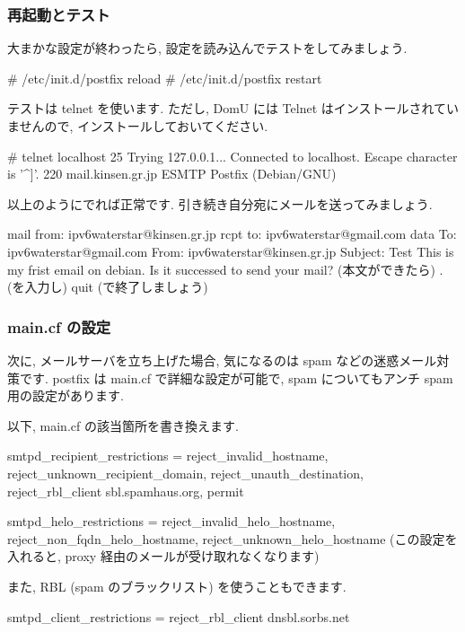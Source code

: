 \documentclass[mingoth,a4paper]{jsarticle}
\begin{document}
\subsubsection{再起動とテスト}
大まかな設定が終わったら, 設定を読み込んでテストをしてみましょう.
\begin{commandline}
# /etc/init.d/postfix reload
# /etc/init.d/postfix restart
\end{commandline}
テストは telnet を使います. ただし, DomU には Telnet はインストールされていませんので, インストールしておいてください.
\begin{commandline}
# telnet localhost 25
  Trying 127.0.0.1...
  Connected to localhost.
  Escape character is '^]'.
  220 mail.kinsen.gr.jp ESMTP Postfix (Debian/GNU)
\end{commandline}
以上のようにでれば正常です. 引き続き自分宛にメールを送ってみましょう.
\begin{commandline}
  mail from: ipv6waterstar@kinsen.gr.jp
  rcpt to: ipv6waterstar@gmail.com
  data
  To: ipv6waterstar@gmail.com
  From: ipv6waterstar@kinsen.gr.jp
  Subject: Test
  This is my frist email on debian. Is it successed to send your mail?
       (本文ができたら)
  .    (を入力し)
  quit (で終了しましょう)
\end{commandline}

\subsubsection{main.cf の設定}
次に, メールサーバを立ち上げた場合, 気になるのは spam などの迷惑メール対策です. postfix は main.cf で詳細な設定が可能で, spam についてもアンチ spam 用の設定があります.

以下, main.cf の該当箇所を書き換えます.
\begin{commandline}
smtpd_recipient_restrictions = reject_invalid_hostname,
        reject_unknown_recipient_domain,
        reject_unauth_destination,
        reject_rbl_client sbl.spamhaus.org,
        permit

smtpd_helo_restrictions = reject_invalid_helo_hostname,
        reject_non_fqdn_helo_hostname,
        reject_unknown_helo_hostname (この設定を入れると, proxy 経由のメールが受け取れなくなります)
\end{commandline}
また, RBL (spam のブラックリスト) を使うこともできます.
\begin{commandline}
smtpd_client_restrictions = reject_rbl_client dnsbl.sorbs.net
\end{commandline}
\end{document}
